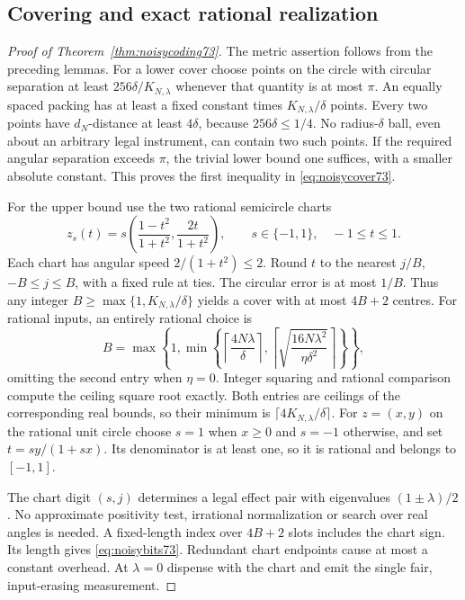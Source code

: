 \subsection{Covering and exact rational realization}
\begin{proof}[Proof of Theorem~\ref{thm:noisycoding73}]
The metric assertion follows from the preceding lemmas. For a lower
cover choose points on the circle with circular separation at least
$256\delta/K_{N,\lambda}$ whenever that quantity is at most $\pi$.
An equally spaced packing has at least a fixed constant times
$K_{N,\lambda}/\delta$ points. Every two points have $d_N$-distance
at least $4\delta$, because $256\delta\le1/4$.
No radius-$\delta$ ball, even about an arbitrary legal instrument, can
contain two such points. If the required angular separation exceeds
$\pi$, the trivial lower bound one suffices, with a smaller absolute
constant. This proves the first inequality in \eqref{eq:noisycover73}.

For the upper bound use the two rational semicircle charts
\begin{equation}\label{eq:circlechart73}
 z_s(t)=s\left(\frac{1-t^2}{1+t^2},\frac{2t}{1+t^2}\right),
                 \qquad s\in\{-1,1\},\quad -1\le t\le1.
\end{equation}
Each chart has angular speed $2/(1+t^2)\le2$. Round $t$ to the
nearest $j/B$, $-B\le j\le B$, with a fixed rule at ties. The
circular error is at most $1/B$. Thus any integer
$B\ge\max\{1,K_{N,\lambda}/\delta\}$ yields a cover with at most
$4B+2$ centres. For rational inputs, an entirely rational choice is
\begin{equation}\label{eq:noisygrid73}
 B=\max\left\{1,\min\left\{
   \left\lceil\frac{4N\lambda}{\delta}\right\rceil,
   \left\lceil\sqrt{\frac{16N\lambda^2}{\eta\delta^2}}\right\rceil
                                  \right\}\right\},
\end{equation}
omitting the second entry when $\eta=0$. Integer squaring and rational
comparison compute the ceiling square root exactly. Both entries are
ceilings of the corresponding real bounds, so their minimum is
$\lceil4K_{N,\lambda}/\delta\rceil$.
For $z=(x,y)$ on the rational unit circle choose $s=1$ when $x\ge0$
and $s=-1$ otherwise, and set $t=sy/(1+sx)$. Its denominator is at
least one, so it is rational and belongs to $[-1,1]$.

The chart digit $(s,j)$ determines a legal effect pair with eigenvalues
$(1\pm\lambda)/2$. No approximate positivity test, irrational
normalization or search over real angles is needed. A fixed-length
index over $4B+2$ slots includes the chart sign. Its length gives
\eqref{eq:noisybits73}. Redundant chart endpoints cause at most a
constant overhead. At $\lambda=0$ dispense with the chart and emit the
single fair, input-erasing measurement.
\end{proof}

